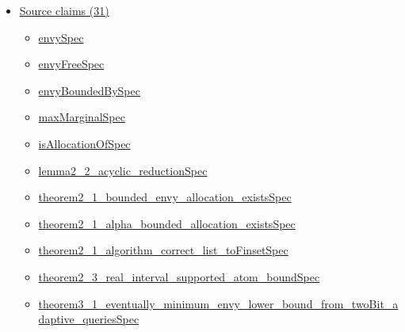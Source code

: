 \documentclass[10pt]{article}
\begin{document}
\begin{itemize}[leftmargin=1.2em]
\begin{itemize}[leftmargin=1.2em]
\item \hyperlink{library-prerequisite-dda55a9e64156860}{EconCSLib.Probability.RealIntervalPartition}
\item \hyperlink{library-prerequisite-2c0f1f3947503cee}{EconCSLib.Probability.RealIntervalPartition.Piece}
\item \hyperlink{library-prerequisite-9afdd7dfd30f8288}{EconCSLib.Probability.RealIntervalPartition.instDecidableEq}
\item \hyperlink{library-prerequisite-a0fbaf500061520c}{EconCSLib.Probability.RealIntervalPartition.instFintype}
\item \hyperlink{library-prerequisite-e378c72561c6d763}{EconCSLib.Probability.RealIntervalPartition.pieceSet}
\item \hyperlink{library-prerequisite-7fec9dedef722fc8}{EconCSLib.pmfProb}
\item \hyperlink{library-prerequisite-38eb9a31a47bfbd9}{EconCSLib.pmfProduct}
\item \hyperlink{library-prerequisite-00a2add8d3a6edfc}{EconCSLib.uniformPMF}
\end{itemize}
\item \hyperlink{source-section-f10b5f68e4acf3dc}{Source claims (31)}
\begin{itemize}[leftmargin=1.2em]
\item \hyperlink{source-claim-53633897e55ca628}{envySpec}
\item \hyperlink{source-claim-6565bf051b780aba}{envyFreeSpec}
\item \hyperlink{source-claim-03adcb64d9b25a7f}{envyBoundedBySpec}
\item \hyperlink{source-claim-6f6c0a542c5926f8}{maxMarginalSpec}
\item \hyperlink{source-claim-72f05d50cd4ce742}{isAllocationOfSpec}
\item \hyperlink{source-claim-2458ea063371ccee}{lemma2\_2\_acyclic\_reductionSpec}
\item \hyperlink{source-claim-699685670f75744b}{theorem2\_1\_bounded\_envy\_allocation\_existsSpec}
\item \hyperlink{source-claim-c24c330509cb89e7}{theorem2\_1\_alpha\_bounded\_allocation\_existsSpec}
\item \hyperlink{source-claim-d94f2abb19eceeb5}{theorem2\_1\_algorithm\_correct\_list\_toFinsetSpec}
\item \hyperlink{source-claim-488983f780b608da}{theorem2\_3\_real\_interval\_supported\_atom\_boundSpec}
\item \hyperlink{source-claim-e6ceda312a1e0767}{theorem3\_1\_eventually\_minimum\_envy\_lower\_bound\_from\_twoBit\_adaptive\_queriesSpec}

\end{itemize}
\end{itemize}
\end{document}
